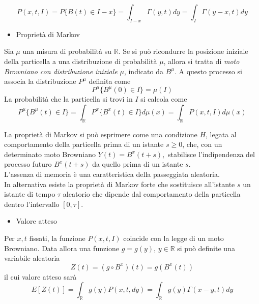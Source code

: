 \documentclass[a4paper,12pt, draft]{article}
\theoremstyle{break}
\numberwithin{equation}{section}
\begin{document}
\[
  P(x, t, I) = P\{B(t) \in I-x\} = \int_{I-x} \Gamma(y,t) dy = \int_I \Gamma(y-x,t)dy
\]
\begin{itemize}
  \item Proprietà di Markov
\end{itemize}
Sia \(\mu\) una misura di probabilità su \(\mathbb{R}\). Se si può ricondurre la posizione iniziale della particella a una distribuzione di probabilità \(\mu\), allora si tratta di \emph{moto Browniano con distribuzione iniziale }\(\mu\), indicato da \(B^{\mu}\). A questo processo si associa la distribuzione \(P^{\mu}\) definita come
\[
  P^{\mu}\{B^{\mu}(0)\in I\} = \mu(I)
\]
La probabilità che la particella si trovi in \(I\) si calcola come
\[
  P^{\mu}\{B^{\mu}(t) \in I\} = \int_{\mathbb{R}} P^{x}\{B^x(t)\in I\}d\mu (x) = \int_{\mathbb{R}}P(x,t,I)d\mu(x)                                             
\]

La proprietà di Markov si può esprimere come una condizione \(H\), legata al comportamento della particella prima di un istante \(s\geq 0\), che, con un determinato moto Browniano 
\(Y(t) = B^x (t+s),\)
stabilisce l'indipendenza del processo futuro 
\(B^x(t+s)\)
da quello prima di un istante \(s\). \\
L'assenza di memoria è una caratteristica della passeggiata aleatoria. \\
In alternativa esiste la proprietà di Markov forte che sostituisce all'istante \(s\) un istante di tempo \(\tau\) aleatorio che dipende dal comportamento della particella dentro l'intervallo \([0, \tau]\).
\begin{itemize}
  \item Valore atteso
\end{itemize}
Per \(x,t\) fissati, la funzione \(P(x,t,I)\) coincide con la legge di un moto Browniano. Data allora una funzione \(g = g(y), \, y \in \mathbb{R}\) si può definite una variabile aleatoria
\[
  Z(t) = (g \circ B^x)(t) = g(B^x(t))
\]
il cui valore atteso sarà
\[
  E[Z(t)] = \int_{\mathbb{R}} g(y)P(x,t,dy) = \int_{\mathbb{R}} g(y) \Gamma(x-y,t)dy
\]
\end{document}
